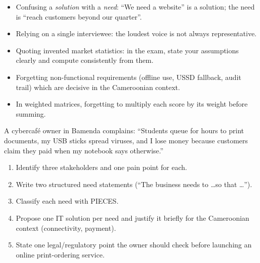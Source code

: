 \documentclass[11pt]{article}
\begin{document}
\begin{attention}
\begin{itemize}
    \item Confusing a \emph{solution} with a \emph{need}: ``We need a website'' is a solution; the need is ``reach customers beyond our quarter''.
    \item Relying on a single interviewee: the loudest voice is not always representative.
    \item Quoting invented market statistics: in the exam, state your assumptions clearly and compute consistently from them.
    \item Forgetting non-functional requirements (offline use, USSD fallback, audit trail) which are decisive in the Cameroonian context.
    \item In weighted matrices, forgetting to multiply each score by its weight before summing.
\end{itemize}
\end{attention}

\begin{exercice}
A cybercafé owner in Bamenda complains: ``Students queue for hours to print documents, my USB sticks spread viruses, and I lose money because customers claim they paid when my notebook says otherwise.''
\begin{enumerate}
    \item Identify three stakeholders and one pain point for each.
    \item Write two structured need statements (``The business needs to \ldots so that \ldots'').
    \item Classify each need with PIECES.
    \item Propose one IT solution per need and justify it briefly for the Cameroonian context (connectivity, payment).
    \item State one legal/regulatory point the owner should check before launching an online print-ordering service.
\end{enumerate}
\end{exercice}
\end{document}
